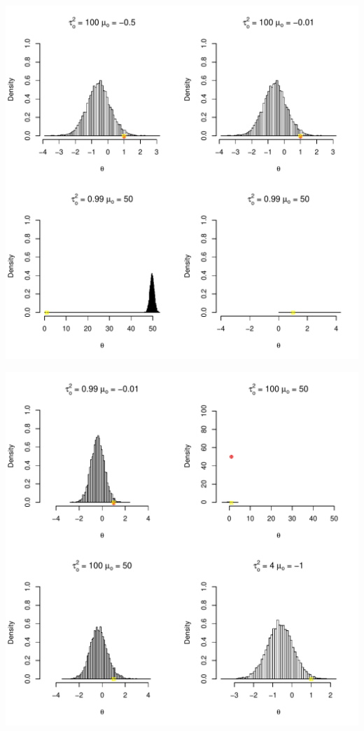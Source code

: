 \documentclass{article}\usepackage[]{graphicx}\usepackage[]{color}
\makeatletter
\def\maxwidth{ %
  \ifdim\Gin@nat@width>\linewidth
    \linewidth
  \else
    \Gin@nat@width
  \fi
}
\newenvironment{knitrout}{}{} %
\makeatother
\begin{document}
\begin{enumerate}
\begin{knitrout}
\color{fgcolor}
\includegraphics[width=\maxwidth]{figure/prob1xxx-1} 

\includegraphics[width=\maxwidth]{figure/prob1xxx-2} 


\end{knitrout}
\end{enumerate}
\end{document}
